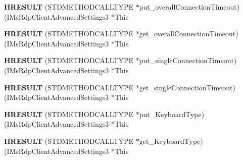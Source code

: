 \begin{DoxyCompactItemize}
\mbox{\label{struct_i_ms_rdp_client_advanced_settings3_vtbl_a79552cf886f93fee674b92bf83992f29}} 
{\bfseries H\+R\+E\+S\+U\+LT} (S\+T\+D\+M\+E\+T\+H\+O\+D\+C\+A\+L\+L\+T\+Y\+PE $\ast$put\+\_\+overall\+Connection\+Timeout)(I\+Ms\+Rdp\+Client\+Advanced\+Settings3 $\ast$This
\item 
\mbox{\label{struct_i_ms_rdp_client_advanced_settings3_vtbl_a89bd6a02e06efbb7b53d5ec6ba4a3e69}} 
{\bfseries H\+R\+E\+S\+U\+LT} (S\+T\+D\+M\+E\+T\+H\+O\+D\+C\+A\+L\+L\+T\+Y\+PE $\ast$get\+\_\+overall\+Connection\+Timeout)(I\+Ms\+Rdp\+Client\+Advanced\+Settings3 $\ast$This
\item 
\mbox{\label{struct_i_ms_rdp_client_advanced_settings3_vtbl_a3021cf8f8403ee2400f67825b5ea33ff}} 
{\bfseries H\+R\+E\+S\+U\+LT} (S\+T\+D\+M\+E\+T\+H\+O\+D\+C\+A\+L\+L\+T\+Y\+PE $\ast$put\+\_\+single\+Connection\+Timeout)(I\+Ms\+Rdp\+Client\+Advanced\+Settings3 $\ast$This
\item 
\mbox{\label{struct_i_ms_rdp_client_advanced_settings3_vtbl_a12fe40c8840bbed461044f33c0ff62a3}} 
{\bfseries H\+R\+E\+S\+U\+LT} (S\+T\+D\+M\+E\+T\+H\+O\+D\+C\+A\+L\+L\+T\+Y\+PE $\ast$get\+\_\+single\+Connection\+Timeout)(I\+Ms\+Rdp\+Client\+Advanced\+Settings3 $\ast$This
\item 
\mbox{\label{struct_i_ms_rdp_client_advanced_settings3_vtbl_a4156d6f8172a544c782cd1b3e7b8b5c2}} 
{\bfseries H\+R\+E\+S\+U\+LT} (S\+T\+D\+M\+E\+T\+H\+O\+D\+C\+A\+L\+L\+T\+Y\+PE $\ast$put\+\_\+\+Keyboard\+Type)(I\+Ms\+Rdp\+Client\+Advanced\+Settings3 $\ast$This
\item 
\mbox{\label{struct_i_ms_rdp_client_advanced_settings3_vtbl_a7e98e4d5c511078fe68d8e90477562da}} 
{\bfseries H\+R\+E\+S\+U\+LT} (S\+T\+D\+M\+E\+T\+H\+O\+D\+C\+A\+L\+L\+T\+Y\+PE $\ast$get\+\_\+\+Keyboard\+Type)(I\+Ms\+Rdp\+Client\+Advanced\+Settings3 $\ast$This
\item 
\mbox{\label{struct_i_ms_rdp_client_advanced_settings3_vtbl_a9bbac12a3c58c42809a5d9f60a73ab6a}} 

\end{DoxyCompactItemize}
